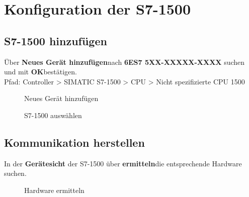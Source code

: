 \section{Konfiguration der S7-1500} \label{sec: Konfiguration_der_S7_1500}

\subsection{S7-1500 hinzufügen}
Über \glqq\textbf{Neues Gerät hinzufügen}\grqq\:nach \textbf{6ES7 5XX-XXXXX-XXXX} suchen und mit \glqq\textbf{OK}\grqq\:bestätigen.\\
Pfad: Controller > SIMATIC S7-1500 > CPU > Nicht spezifizierte CPU 1500
\begin{figure}[H]
    \centering
   \begin{minipage}[b]{.4\linewidth}
        \centering
        \caption[Neues Gerät hinzufügen]{Neues Gerät hinzufügen}
        \label{fig:Bild3.1}
   \end{minipage}
   \hspace{.1\linewidth}%
   \begin{minipage}[b]{.4\linewidth}
        \centering
        \caption[S7-1500 auswählen]{S7-1500 auswählen}
        \label{fig:Bild3.2}
   \end{minipage}
\end{figure}

\clearpage

\subsection{Kommunikation herstellen}
In der \textbf{Gerätesicht} der S7-1500 über \glqq\textbf{ermitteln}\grqq\:die entsprechende Hardware suchen.
\begin{figure}[H]
   \centering
   \caption[Hardware ermitteln]{Hardware ermitteln}
   \label{fig:Bild3.3}
\end{figure}

